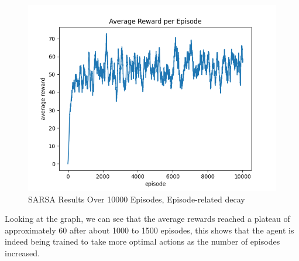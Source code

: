 \begin{figure}[H] %
    \centering
    \includegraphics[width=0.75\linewidth]{sarsa-average-10k-epsilon05.png}
    \caption{SARSA Results Over 10000 Episodes, Episode-related decay}
\end{figure}

Looking at the graph, we can see that the average rewards reached a plateau of approximately 60 after about 1000 to 1500 episodes, this shows that the agent is indeed being trained to
take more optimal actions as the number of episodes increased.





